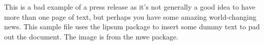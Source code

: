 \documentclass[a4paper,11pt]{pressrelease}
\begin{document}
\begin{pressrelease}

This is a bad example of a press release as it's not generally a
good idea to have more than one page of text, but perhaps you have
some amazing world-changing news. This sample file uses the
\textsf{lipsum}
package to insert some dummy text to pad out the document.
The image is from the \textsf{mwe} package.

\lipsum[1-4]

\begin{about}
\lipsum[5]
\end{about}

\end{pressrelease}
\end{document}
